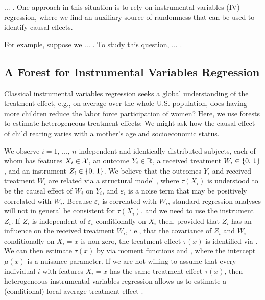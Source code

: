 \documentclass[aos]{imsart}
\theoremstyle{plain}
\theoremstyle{definition}
\theoremstyle{remark}
\begin{document}
\begin{CJK}{UTF8}{gbsn}
... . One approach in this situation is to rely on instrumental variables (IV) regression, where we find an auxiliary source of randomness that can be used to identify causal effects.

For example, suppose we ... . To study this question, ... .

\subsection{A Forest for Instrumental Variables Regression}
\label{sec:iv_methods}

Classical instrumental variables regression seeks a global understanding of the treatment
effect, e.g., on average over the whole U.S. population, does having more children reduce the labor force participation
of women? Here, we use forests to estimate heterogeneous
treatment effects: We might ask how the causal effect of child rearing varies with a mother's age and
socioeconomic status.

We observe $i = 1, \, ..., \, n$ independent and identically distributed subjects,
each of whom has features $X_i \in \mathcal{X}$, an outcome $Y_i \in \mathbb{R}$, a received treatment $W_i \in \left\{0, \, 1\right\}$,
and an instrument $Z_i \in \left\{0, \, 1\right\}$. We believe that the outcomes $Y_i$ and received treatment $W_i$ are
related via a structural model
,
where $\tau(X_i)$ is understood to be the causal effect of $W_i$ on $Y_i$, and
$\varepsilon_i$ is a noise term that may be positively correlated with $W_i$. Because $\varepsilon_i$
is correlated with $W_i$, standard regression analyses will not in general be consistent for $\tau(X_i)$,
and we need to use the instrument $Z_i$. If $Z_i$ is independent of $\varepsilon_i$
conditionally on $X_i$ then, provided that $Z_i$ has an influence on the received treatment $W_i$, i.e., that
the covariance of $Z_i$ and $W_i$ conditionally on $X_i = x$ is non-zero, the treatment effect
$\tau(x)$ is identified via
.
We can then estimate $\tau(x)$ by via moment functions
 and
,
 where the intercept $\mu(x)$ is a nuisance parameter.
If we are not willing to assume that every individual $i$ with features
$X_i = x$ has the same treatment effect $\tau(x)$,
then heterogeneous instrumental variables regression
allows us to estimate a (conditional) local average treatment effect
\citep{abadie2003semiparametric,imbens1994identification}.
 

\end{CJK}
\end{document}
